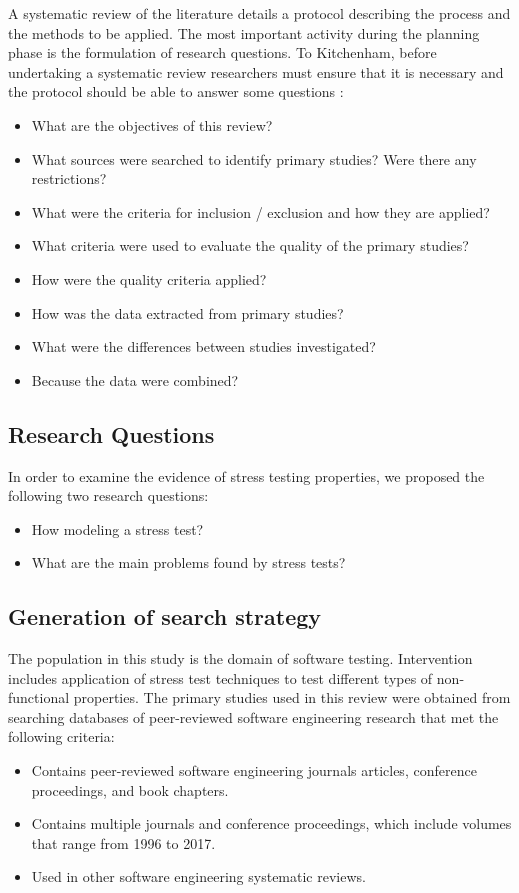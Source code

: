 \documentclass{report}
\begin{document}
A systematic review of the literature details a protocol describing the process and the methods to be applied. The most important activity during the
planning phase is the formulation of research questions. To Kitchenham,
before undertaking a systematic review researchers must ensure that it is necessary and the protocol should be able to answer some questions \cite{Marinho2014}:

\begin{itemize}
\item What are the objectives of this review?
\item What sources were searched to identify primary studies? Were there any restrictions?
\item What were the criteria for inclusion / exclusion and how they are applied? 
\item What criteria were used to evaluate the quality of the primary studies?
\item How were the quality criteria applied?
\item How was the data extracted from primary studies?
\item What were the differences between studies investigated?
\item  Because the data were combined?
\end{itemize}


\subsection{Research Questions}

In order to examine the evidence of stress testing properties, we proposed the following two research questions:


\begin{itemize}
\item How modeling a stress test?
\item What are the main problems found by stress tests?
\end{itemize}


\subsection{Generation of search strategy}


The population in this study is the domain of software testing. Intervention includes application of stress test techniques to test different types of non-functional properties. The primary studies used in this review were obtained from
searching databases of peer-reviewed software engineering research that met the following criteria:
\begin{itemize}
\item  Contains peer-reviewed software engineering journals articles, conference proceedings, and book chapters.
\item   Contains multiple journals and conference proceedings,
which include volumes that range from 1996 to 2017.
\item  Used in other software engineering systematic reviews.
\end{itemize}
\end{document}
